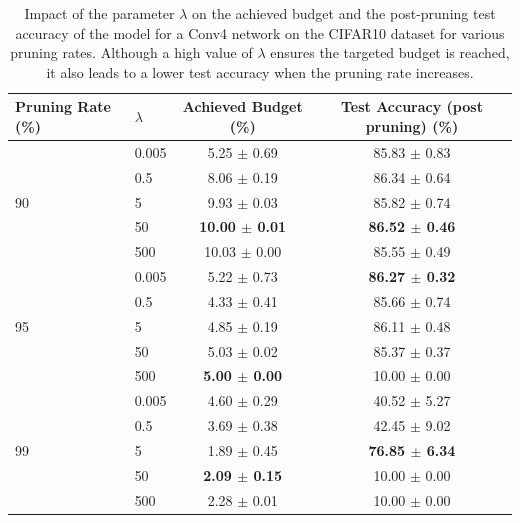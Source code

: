 \begin{table}[tbp]
  \centering
  \begin{center}
    \begin{tabular}{llcc}
      \toprule
      \textbf{Pruning Rate} (\%) & \textbf{$\lambda$} & \textbf{Achieved Budget} (\%)
      & \textbf{Test Accuracy (post pruning)} (\%) \\
      \midrule
      \multirow{5}{*}{90} & 0.005 & 5.25 $\pm$ 0.69 & 85.83 $\pm$ 0.83 \\
      & 0.5 & 8.06 $\pm$ 0.19 & 86.34 $\pm$ 0.64 \\
      & 5 & 9.93 $\pm$ 0.03 & 85.82 $\pm$ 0.74 \\
      & 50 & \textbf{10.00 $\pm$ 0.01} & \textbf{86.52 $\pm$ 0.46} \\
      & 500 & 10.03 $\pm$ 0.00 & 85.55 $\pm$ 0.49  \\
      \midrule
      \multirow{5}{*}{95} & 0.005 & 5.22 $\pm$ 0.73 & \textbf{86.27 $\pm$ 0.32} \\
      & 0.5 & 4.33 $\pm$ 0.41 & 85.66 $\pm$ 0.74 \\
      & 5 & 4.85 $\pm$ 0.19 & 86.11 $\pm$ 0.48 \\
      & 50 & 5.03 $\pm$ 0.02 & 85.37 $\pm$ 0.37 \\
      & 500 & \textbf{5.00 $\pm$ 0.00} & 10.00 $\pm$ 0.00 \\
      \midrule
      \multirow{5}{*}{99} & 0.005 & 4.60 $\pm$ 0.29 & 40.52 $\pm$ 5.27 \\
      & 0.5 & 3.69 $\pm$ 0.38 & 42.45 $\pm$ 9.02 \\
      & 5 & 1.89 $\pm$ 0.45 & \textbf{76.85 $\pm$ 6.34} \\
      & 50 & \textbf{2.09 $\pm$ 0.15} & 10.00 $\pm$ 0.00 \\
      & 500 & 2.28 $\pm$ 0.01 & 10.00 $\pm$ 0.00 \\
      \bottomrule
    \end{tabular}
  \end{center}
  \caption{
    Impact of the parameter $\lambda$ on the achieved budget and the post-pruning test accuracy of the model for a Conv4 network on the CIFAR10 dataset
    for various pruning rates. Although a high value of $\lambda$ ensures 
    the targeted budget is reached, it also leads to a lower test accuracy when
    the pruning rate increases.}
    \label{tab:chap1:lambda_impact}
\end{table}


